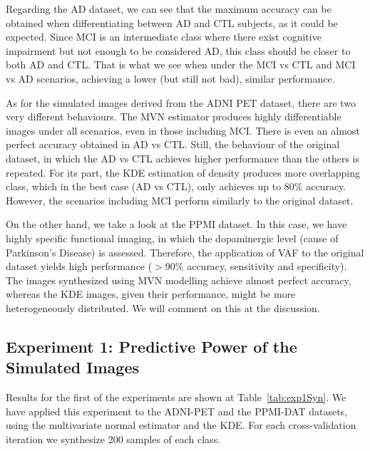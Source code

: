 Regarding the \ac{AD} dataset, we can see that the maximum accuracy can be obtained when differentiating between \ac{AD} and \ac{CTL} subjects, as it could be expected. Since \ac{MCI} is an intermediate class where there exist cognitive impairment but not enough to be considered \ac{AD}, this class should be closer to both \ac{AD} and \ac{CTL}. That is what we see when under the \ac{MCI} vs \ac{CTL} and \ac{MCI} vs \ac{AD} scenarios, achieving a lower (but still not bad), similar performance.  %

As for the simulated images derived from the ADNI PET dataset, there are two very different behaviours. The \ac{MVN} estimator produces highly differentiable images under all scenarios, even in those including \ac{MCI}. There is even an almost perfect accuracy obtained in \ac{AD} vs \ac{CTL}. Still, the behaviour of the original dataset, in which the \ac{AD} vs \ac{CTL} achieves higher performance than the others is repeated. For its part, the \ac{KDE} estimation of density produces more overlapping class, which in the best case (\ac{AD} vs \ac{CTL}), only achieves up to 80\% accuracy. However, the scenarios including \ac{MCI} perform similarly to the original dataset. 

On the other hand, we take a look at the PPMI dataset. In this case, we have highly specific functional imaging, in which the dopaminergic level (cause of Parkinson's Disease) is assessed. Therefore, the application of VAF to the original dataset yields high performance ($>$90\% accuracy, sensitivity and specificity). The images synthesized using \ac{MVN} modelling achieve almost perfect accuracy, whereas the \ac{KDE} images, given their performance, might be more heterogeneously distributed. We will comment on this at the discussion.  

\subsection{Experiment 1: Predictive Power of the Simulated Images}
Results for the first of the experiments are shown at Table~\ref{tab:exp1Syn}. We have applied this experiment to the ADNI-PET and the PPMI-DAT datasets, using the multivariate normal estimator and the \ac{KDE}. For each cross-validation iteration we synthesize 200 samples of each class. 

